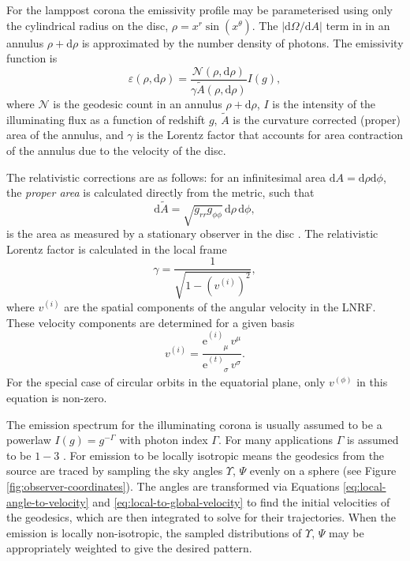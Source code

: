 \documentclass[fleqn,usenatbib]{mnras}
\newcommand{\e}{\text{e}}
\renewcommand{\d}{\text{d}}
\newcommand{\utensor}[3]{#1^{#2}_{\phantom{#2}#3}}
\begin{document}
For the lamppost corona the emissivity profile may be parameterised using only
the cylindrical radius on the disc, $\rho = x^r \sin(x^\theta)$. The $\lvert \d
\Omega / \d A \rvert$ term in in an annulus $\rho + \d \rho$ is approximated by
the number density of photons. The emissivity function is
\begin{equation}
    \varepsilon (\rho, \d \rho) = \frac{\mathcal{N}(\rho, \d \rho)}{\gamma
    \tilde{A}(\rho, \d \rho)} I(g),
\end{equation}
where $\mathcal{N}$ is the geodesic count in an annulus $\rho + \d \rho$, $I$ is
the intensity of the illuminating flux as a function of redshift $g$,
$\tilde{A}$ is the curvature corrected (proper) area of the annulus, and
$\gamma$ is the Lorentz factor that accounts for area contraction of the annulus
due to the velocity of the disc.

The relativistic corrections are as follows: for an infinitesimal area $\d A = \d
\rho\d\phi$, the \textit{proper area} is calculated directly from the metric,
such that
\begin{equation}
    \d\tilde{A} = \sqrt{g_{rr} g_{\phi\phi}}\, \d \rho\, \d \phi,
\end{equation}
is the area as measured by a stationary observer in the disc
\citep[e.g.][]{wilkins_understanding_2012}. The relativistic
Lorentz factor is calculated in the local frame
\begin{equation}
    \gamma = \frac{1}{\sqrt{1 - \left(v^{(i)}\right)^2}},
\end{equation}
where $v^{(i)}$ are the spatial components of the angular velocity in the LNRF.
These velocity components are determined for a given basis
\begin{equation}
    v^{(i)} = \frac{\utensor{\e}{(i)}{\mu}\, v^\mu}{\utensor{\e}{(t)}{\sigma}\,
    v^\sigma}.
\end{equation}
For the special case of circular orbits in the equatorial plane, only
$v^{(\phi)}$ in this equation is non-zero.

The emission spectrum for the illuminating corona is usually assumed to be a
powerlaw $I(g) = g^{-\Gamma}$ with photon index $\Gamma$. For many applications
$\Gamma$ is assumed to be $1 - 3$
\citep{mushotzky_agn_pl_1982,remillard_binaries_2006}. For emission to be
locally isotropic means the geodesics from the source are traced by sampling the
sky angles $\Upsilon$, $\Psi$ evenly on a sphere (see Figure
\ref{fig:observer-coordinates}). The angles are transformed via Equations
\eqref{eq:local-angle-to-velocity} and \eqref{eq:local-to-global-velocity} to
find the initial velocities of the geodesics, which are then integrated to solve
for their trajectories. When the emission is locally non-isotropic, the sampled
distributions of $\Upsilon$, $\Psi$ may be appropriately weighted to give the
desired pattern.
\end{document}
